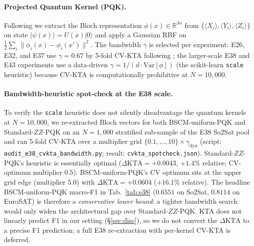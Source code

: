 \documentclass[pdflatex,sn-mathphys]{sn-jnl}
\theoremstyle{plain}
\theoremstyle{remark}
\theoremstyle{definition}
\begin{document}
\paragraph{Projected Quantum Kernel (PQK).}
Following \cite{huang2021} we extract the Bloch representation $\phi(x)\in\mathbb{R}^{3n}$ from $\{\langle X_i\rangle,\langle Y_i\rangle,\langle Z_i\rangle\}$ on state $|\psi(x)\rangle=U(x)|0\rangle$ and apply a Gaussian RBF on $\tfrac{1}{2}\sum_i\|\phi_i(x)-\phi_i(x')\|^2$. The bandwidth $\gamma$ is selected per experiment: E26, E32, and E37 use $\gamma=0.67$ by 5-fold CV-KTA following \cite{shaydulin2022}; the larger-scale E38 and E43 experiments use a data-driven $\gamma = 1/(d \cdot \mathrm{Var}[\phi])$ (the scikit-learn \texttt{scale} heuristic) because CV-KTA is computationally prohibitive at $N=10{,}000$.

\paragraph{Bandwidth-heuristic spot-check at the E38 scale.}
To verify the \texttt{scale} heuristic does not silently disadvantage the quantum kernels at $N=10{,}000$, we re-extracted Bloch vectors for both BSCM-uniform-PQK and Standard-$ZZ$-PQK on an $N=1{,}000$ stratified sub-sample of the E38 So2Sat pool and ran 5-fold CV-KTA over a multiplier grid $\{0.1, \ldots, 10\}\times \gamma_\text{dyn}$ (script: \texttt{audit\_e38\_cvkta\_bandwidth.py}; result: \texttt{cvkta\_spotcheck.json}).  Standard-$ZZ$-PQK's heuristic is essentially optimal ($\Delta\mathrm{KTA}=+0.0043$, $+1.4\%$ relative; CV-optimum multiplier $0.5$).  BSCM-uniform-PQK's CV optimum sits at the upper grid edge (multiplier $5.0$) with $\Delta\mathrm{KTA}=+0.0604$ ($+16.1\%$ relative).  The headline BSCM-uniform-PQK macro-F1 in Tab.~\ref{tab:e38} ($0.6551$ on So2Sat, $0.8114$ on EuroSAT) is therefore a \emph{conservative lower bound}: a tighter bandwidth search would only widen the architectural gap over Standard-$ZZ$-PQK.  KTA does not linearly predict F1 in our setting (\S\ref{sec:disc}), so we do not convert the $\Delta\mathrm{KTA}$ to a precise F1 prediction; a full E38 re-extraction with per-kernel CV-KTA is deferred.
\end{document}
